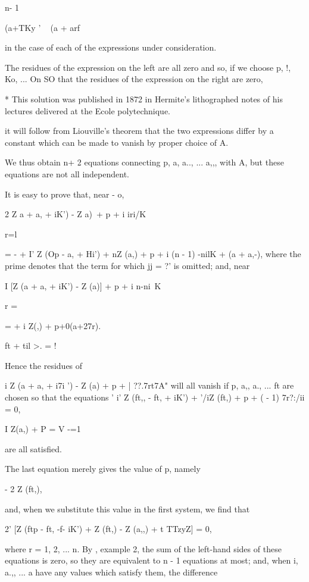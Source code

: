 {{{{{{{{n- 1

(a+TKy ' ~ (a + arf

in the case of each of the expressions under consideration.

The residues of the expression on the left are all zero and so, if we
choose p, !, Ko, ... On SO that the residues of the expression on the
right are zero,

* This solution was published in 1872 in Hermite's lithographed notes
of his lectures delivered at the Ecole polytechnique.

%
%

it will follow from Liouville's theorem that the two expressions
differ by a constant which can be made to vanish by proper choice of
A.

We thus obtain n+ 2 equations connecting p, a, a.., ... a,,, with A,
but these equations are not all independent.

It is easy to prove that, near - o,

2 Z a + a, + iK') - Z a)\ + p + i iri/K

r=l

= - + I' Z (Op - a, + Hi') + nZ (a,) + p + i (n - 1) -nilK + (a +
a,-), where the prime denotes that the term for which jj = ?' is
omitted; and, near

I [Z (a + a, + iK') - Z (a)] + p + i n-ni\ K

r = \

= + i Z(,) + p+0(a+27r).

ft + til >. = !

Hence the residues of

i Z (a + a, + i7i ') - Z (a) + p + | ??.7rt7A" will all vanish if p,
a,, a., ... ft are chosen so that the equations ' i' Z (ft,, - ft, +
iK') + '/iZ (ft,) + p + ( - 1) 7r?:/ii = 0,

I Z(a,) + P = V -=1

are all satisfied.

The last equation merely gives the value of p, namely

- 2 Z (ft,),

and, when we substitute this value in the first system, we find that

2' [Z (ftp - ft, -f- iK') + Z (ft,) - Z (a,,) + t TTzyZ] = 0,

where r = 1, 2, ... n. By , example 2, the sum of the
left-hand sides of these equations is zero, so they are equivalent to
n - 1 equations at most; and, when i, a.,, ... a have any values
which satisfy them, the difference

}}}}}}}}
